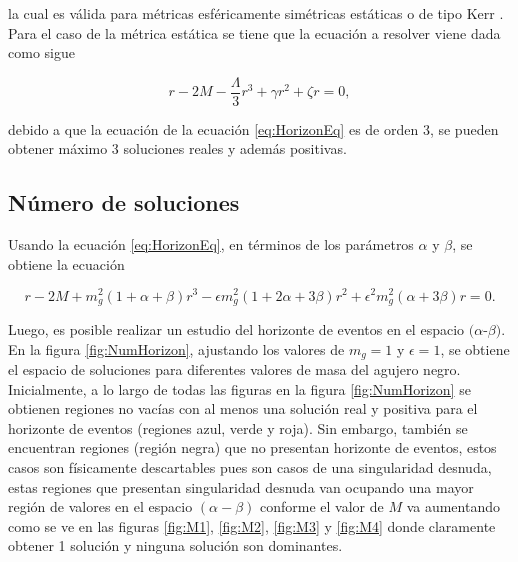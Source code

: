  la cual es válida para métricas esféricamente simétricas estáticas o de tipo Kerr \cite{BabmiBlackHoles}.\\

Para el caso de la métrica estática se tiene que la ecuación a resolver viene dada como sigue

\begin{equation}
    r-2M-\dfrac{\Lambda}{3}r^3+\gamma r^2 + \zeta r=0,
    \label{eq:HorizonEq}
\end{equation}
 
 debido a que la ecuación de la ecuación \eqref{eq:HorizonEq} es de orden 3, se pueden obtener máximo 3 soluciones reales y además positivas.
 
 \subsection{Número de soluciones}
 
 Usando la ecuación \eqref{eq:HorizonEq}, en términos de los parámetros $\alpha$ y $\beta$, se obtiene la ecuación 
 
 \begin{equation}
     r-2M+m_g^2(1+\alpha+\beta)r^3-\epsilon m_g^2(1+2\alpha+3\beta)r^2+\epsilon^2m_g^2(\alpha+3\beta)r=0.
     \label{eq:solucionesHorizonte}
 \end{equation}
 
 Luego, es posible realizar un estudio del horizonte de eventos en el espacio $(\alpha$-$\beta)$. En la figura \ref{fig:NumHorizon}, ajustando los valores de $m_g=1$ y $\epsilon=1$, se obtiene el espacio de soluciones para diferentes valores de masa del agujero negro.\\
 
 Inicialmente, a lo largo de todas las figuras en la figura \ref{fig:NumHorizon} se obtienen regiones no vacías con al menos una solución real y positiva para el horizonte de eventos (regiones azul, verde y roja). Sin embargo, también se encuentran regiones (región negra) que no presentan horizonte de eventos, estos casos son físicamente descartables pues son casos de una singularidad desnuda, estas regiones que presentan singularidad desnuda van ocupando una mayor región de valores en el espacio $(\alpha-\beta)$ conforme el valor de $M$ va aumentando como se ve en las figuras \ref{fig:M1}, \ref{fig:M2}, \ref{fig:M3} y \ref{fig:M4} donde claramente obtener 1 solución y ninguna solución son dominantes.\\
 
